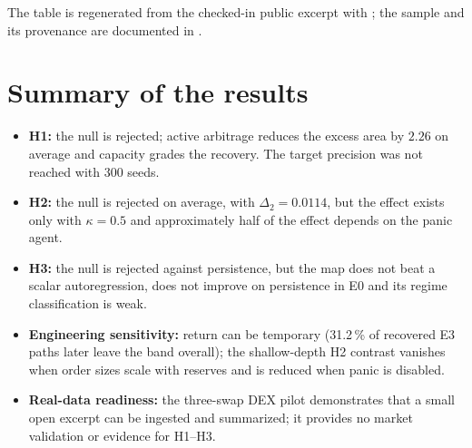 The table is regenerated from the checked-in public excerpt with ; the sample and its provenance are documented in .

\section{Summary of the results}

\begin{itemize}
  \item \textbf{H1:} the null is rejected; active arbitrage reduces the excess area by $2.26$ on average and capacity grades the recovery. The target precision was not reached with 300 seeds.
  \item \textbf{H2:} the null is rejected on average, with $\Delta_2=0.0114$, but the effect exists only with $\kappa=0.5$ and approximately half of the effect depends on the panic agent.
  \item \textbf{H3:} the null is rejected against persistence, but the map does not beat a scalar autoregression, does not improve on persistence in E0 and its regime classification is weak.
  \item \textbf{Engineering sensitivity:} return can be temporary (31.2\,\% of recovered E3 paths later leave the band overall); the shallow-depth H2 contrast vanishes when order sizes scale with reserves and is reduced when panic is disabled.
  \item \textbf{Real-data readiness:} the three-swap DEX pilot demonstrates that a small open excerpt can be ingested and summarized; it provides no market validation or evidence for H1--H3.
\end{itemize}
